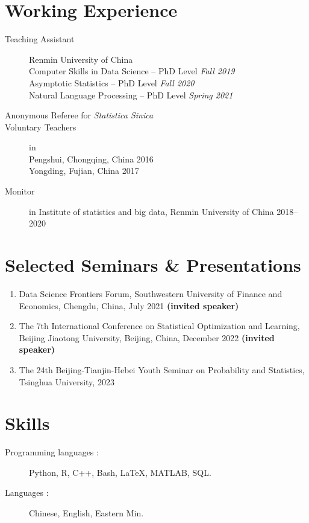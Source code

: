 \documentclass[margin,line]{resume-bib}
\begin{document}
\begin{resume}
\section{\mysidestyle Working Experience}\vspace{1mm}	     
\begin{description}
    \item[Teaching Assistant]\small{Renmin University of China} \\
            Computer Skills in Data Science -- PhD Level \hfill \textsl{Fall 2019} \\
            Asymptotic Statistics -- PhD Level \hfill \textsl{Fall 2020} \\
            Natural Language Processing -- PhD Level \hfill \textsl{Spring 2021} 
    \item[Anonymous Referee for {\it  Statistica Sinica}]
    \item[Voluntary Teachers] in \\
    Pengshui, Chongqing, China \hfill 2016 \\
    Yongding, Fujian, China \hfill 2017
    \item[Monitor] in Institute of statistics and big data, Renmin University of China \hfill 2018--2020
\end{description}

\section{\mysidestyle Selected Seminars {\footnotesize \&} Presentations} \vspace{1mm}	\vspace{1mm}	

\begin{enumerate}
\item Data Science Frontiers Forum, Southwestern University of Finance and Economics, Chengdu, China, July 2021 {\bf (invited speaker)}
\item The 7th International Conference on Statistical Optimization and Learning, Beijing Jiaotong University, Beijing, China, December 2022 {\bf (invited speaker)}
\item The 24th Beijing-Tianjin-Hebei Youth Seminar on Probability and Statistics, Tsinghua University, 2023
\end{enumerate}

\section{\mysidestyle Skills}\vspace{1mm}	  
\begin{description}
			\item[Programming languages $\!\!:$] Python, R, C++, Bash, \LaTeX, MATLAB, SQL.
			\item[Languages $\!\!:$] Chinese, English, Eastern Min.
\end{description}


\end{resume}
\end{document}
